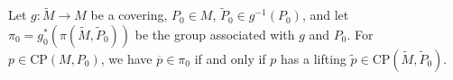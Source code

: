 Let $g: \tilde{M} \rightarrow M$ be a covering, $P_0 \in M$, $\tilde{P}_0 \in g^{-1}(P_0)$, and let $\pi_0 = g_0^*(\pi(\tilde{M}, \tilde{P}_0))$ be the group associated with $g$ and $P_0$. For $p \in \text{CP}(M, P_0)$, we have $\overline{p} \in \pi_0$ if and only if $p$ has a lifting $\tilde{p} \in \text{CP}(\tilde{M}, \tilde{P}_0)$.
